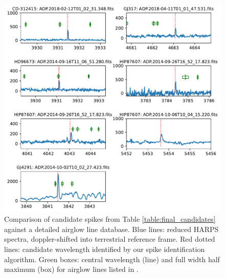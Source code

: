 \documentclass[linenumbers]{aastex631}
\begin{document}
\begin{figure}
    \centering  \includegraphics[width=\textwidth]{airglow_reanalysis.pdf}
    \caption{Comparison of candidate spikes from Table \ref{table:final_candidates} against a detailed airglow line database.  Blue lines: reduced HARPS spectra, doppler-shifted into terrestrial reference frame.  Red dotted lines: candidate wavelength identified by our spike identification algorithm. Green boxes: central wavelength (line) and full width half maximum (box) for airglow lines listed in  \cite{faint_airglow_database}.}
    \label{fig:airglow_reanalysis}
\end{figure}
\end{document}
